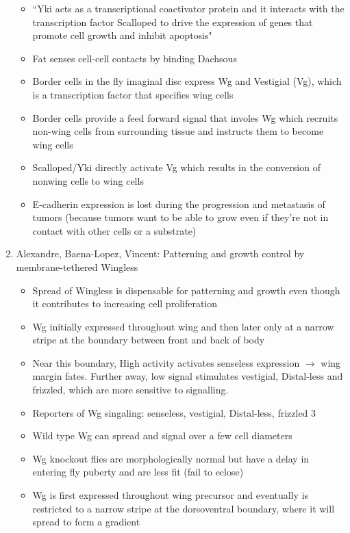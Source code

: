 \documentclass[12pt]{article}
\begin{document}
\begin{enumerate}
\begin{itemize}
	\item ``Yki acts as a transcriptional coactivator protein and it interacts with the transcription factor Scalloped to drive the expression of genes that promote cell growth and inhibit apoptosis"
	\item Fat senses cell-cell contacts by binding Dachsous
	\item Border cells in the fly imaginal disc express Wg and Vestigial (Vg), which is a transcription factor that specifies wing cells
	\item Border cells provide a feed forward signal that involes Wg which recruits non-wing cells from surrounding tissue and instructs them to become wing cells
	\item Scalloped/Yki directly activate Vg which results in the conversion of nonwing cells to wing cells
	\item E-cadherin expression is lost during the progression and metastasis of tumors (because tumors want to be able to grow even if they're not in contact with other cells or a substrate)
\end{itemize}

\item Alexandre, Baena-Lopez, Vincent: Patterning and growth control by membrane-tethered Wingless
\begin{itemize}
	\item Spread of Wingless is dispensable for patterning and growth even though it contributes to increasing cell proliferation
	\item Wg initially expressed throughout wing and then later only at a narrow stripe at the boundary between front and back of body
	\item Near this boundary, High activity activates senseless expression $\rightarrow$ wing margin fates. Further away, low signal stimulates vestigial, Distal-less and frizzled, which are more sensitive to signalling. 
	\item Reporters of Wg singaling: senseless, vestigial, Distal-less, frizzled 3
	\item Wild type Wg can spread and signal over a few cell diameters
	\item Wg knockout flies are morphologically normal but have a delay in entering fly puberty and are less fit (fail to eclose)
	\item  Wg is first expressed throughout wing precursor and eventually is restricted to a narrow stripe at the dorsoventral boundary, where it will spread to form a gradient
\end{itemize}


\end{enumerate}
\end{document}
